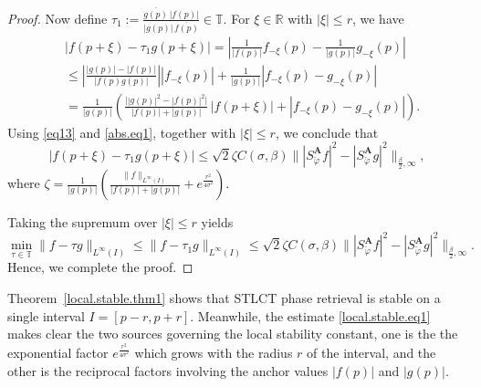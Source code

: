 \documentclass[11pt, reqno]{amsart}
\newcommand{\R}{\mathbb{R}}
\newcommand{\T}{\mathbb{T}}
\numberwithin{equation}{section}
\begin{document}
\begin{proof}
Now define $
\tau_1:=\frac{\overline{g(p)}\,|f(p)|}{|g(p)|\,\overline{f(p)}}\in\mathbb T.$ 
For $\xi\in\R$ with $|\xi|\le r$, we have
\begin{align*}
   & |f(p+\xi)-\tau_1 g(p+\xi)| %
    =   \left| \frac{1}{|f(p)|}f_{-\xi}(p)  -   \frac{1}{|g(p)|}g_{-\xi}(p)    \right| \\
    &\le  \left|    \frac{|g(p)|-|f(p)|}{|f(p)g(p)|}   \right|  |f_{-\xi}(p)|  +
    \frac{1}{|g(p)|}|f_{-\xi}(p)-g_{-\xi}(p)| \\
    &= \frac{1}{|g(p)|}  \left(   \frac{\bigl||g(p)|^2-|f(p)|^2\bigr|}{|f(p)|+|g(p)|}\,|f(p+\xi)|
    +   |f_{-\xi}(p)-g_{-\xi}(p)| \right).
\end{align*}
Using \eqref{eq13} and \eqref{abs.eq1}, together with $|\xi|\le r$, we conclude that
\begin{equation*} |f(p+\xi)-\tau_1 g(p+\xi)| \le\sqrt{2}\zeta C(\sigma,\beta)
\bigl\| |S_{\check{\varphi}}^{\mathbf A}f|^2 - |S_{\check{\varphi}}^{\mathbf A}g|^2\bigr\|_{\frac{\beta}{2},\infty},
\end{equation*} 
where
$\zeta=\frac{1}{|g(p)|}\left(\frac{\|f\|_{L^\infty(I)}}{|f(p)|+|g(p)|}+e^{\frac{r^2}{4\sigma^2}}\right)$.

Taking the supremum over $|\xi|\le r$ yields
\begin{equation*}
\min_{\tau \in \T}\|f-\tau g\|_{L^\infty(I)} \le
\|f-\tau_1 g\|_{L^\infty(I)}\le
 \sqrt{2}\zeta C(\sigma,\beta) \bigl\||S_{\check{\varphi}}^{\mathbf A}f|^2-
|S_{\check{\varphi}}^{\mathbf A}g|^2\bigr\|_{\frac{\beta}{2},\infty}.
\end{equation*} 
	Hence, we complete the proof.   
\end{proof}




Theorem~\ref{local.stable.thm1} shows that STLCT phase retrieval is stable on a single interval $
I=[p-r,p+r]$.  Meanwhile, the estimate \eqref{local.stable.eq1} makes clear the two sources governing the local stability constant, one is the the exponential factor $ e^{\frac{r^2}{4\sigma^2}}$  which grows with the radius $r$ of the interval, and the other is the reciprocal factors involving the anchor values $|f(p)|$ and $|g(p)|$.
\end{document}
